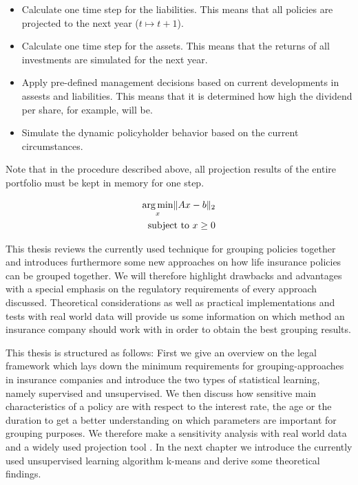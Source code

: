 \begin{itemize}
	\item Calculate one time step for the liabilities. This means that all policies are projected to the next year ($t \mapsto t+1$).
	\item Calculate one time step for the assets. This means that the returns of all investments are simulated for the next year.
	\item Apply pre-defined management decisions based on current developments in assests and liabilities. This means that it is determined how high the dividend per share, for example, will be. 
	\item Simulate the dynamic policyholder behavior based on the current circumstances.
\end{itemize}

Note that in the procedure described above, all projection results of the entire portfolio must be kept in memory for one step.

\begin{align*}
\operatorname*{arg\,min}_x \lVert Ax -b \rVert_2 \\
\text{subject to } x \geq 0
\end{align*}



This thesis reviews the currently used technique for grouping policies together and introduces furthermore some new approaches on how life insurance policies can be grouped together. We will therefore highlight drawbacks and advantages with a special emphasis on the regulatory requirements of every approach discussed. Theoretical considerations as well as practical implementations and tests with real world data will provide us some information on which method an insurance company should work with in order to obtain the best grouping results.  

This thesis is structured as follows: First we give an overview on the legal framework which lays down the minimum requirements for grouping-approaches in insurance companies and introduce the two types of statistical learning, namely supervised and unsupervised. We then discuss how sensitive main characteristics of a policy are with respect to the interest rate, the age or the duration to get a better understanding on which parameters are important for grouping purposes. We therefore make a sensitivity analysis with real world data and a widely used projection tool . In the next chapter we introduce the currently used unsupervised learning algorithm k-means and derive some theoretical findings. 


